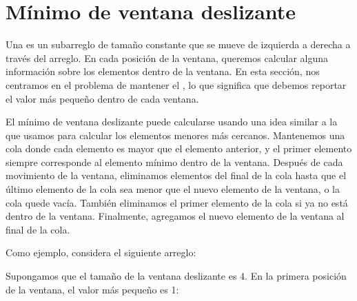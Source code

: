 \section{Mínimo de ventana deslizante}


Una  es un subarreglo de tamaño constante
que se mueve de izquierda a derecha a través del arreglo.
En cada posición de la ventana,
queremos calcular alguna información
sobre los elementos dentro de la ventana.
En esta sección, nos centramos en el problema
de mantener el ,
lo que significa que
debemos reportar el valor más pequeño dentro de cada ventana.

El mínimo de ventana deslizante puede calcularse
usando una idea similar a la que usamos para calcular
los elementos menores más cercanos.
Mantenemos una cola
donde cada elemento es mayor que
el elemento anterior,
y el primer elemento
siempre corresponde al elemento mínimo dentro de la ventana.
Después de cada movimiento de la ventana,
eliminamos elementos del final de la cola
hasta que el último elemento de la cola
sea menor que el nuevo elemento de la ventana,
o la cola quede vacía.
También eliminamos el primer elemento de la cola
si ya no está dentro de la ventana.
Finalmente, agregamos el nuevo elemento de la ventana
al final de la cola.

Como ejemplo, considera el siguiente arreglo:

\begin{center}
\end{center}

Supongamos que el tamaño de la ventana deslizante es 4.
En la primera posición de la ventana, el valor más pequeño es 1:
\begin{center}
\end{center}

